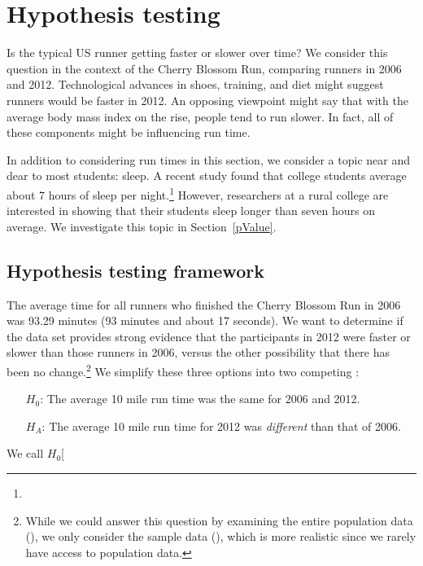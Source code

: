 \section{Hypothesis testing}
\label{hypothesisTesting}


Is the typical US runner getting faster or slower over time? We consider this question in the context of the Cherry Blossom Run, comparing runners in 2006 and 2012. Technological advances in shoes, training, and diet might suggest runners would be faster in 2012. An opposing viewpoint might say that with the average body mass index on the rise, people tend to run slower. In fact, all of these components might be influencing run time.

In addition to considering run times in this section, we consider a topic near and dear to most students: sleep. A recent study found that college students average about 7 hours of sleep per night.\footnote{} However, researchers at a rural college are interested in showing that their students sleep longer than seven hours on average. We investigate this topic in Section~\ref{pValue}.

\subsection{Hypothesis testing framework}

The average time for all runners who finished the Cherry Blossom Run in 2006 was 93.29 minutes (93 minutes and about 17 seconds). We want to determine if the  data set provides strong evidence that the participants in 2012 were faster or slower than those runners in 2006, versus the other possibility that there has been no change.\footnote{While we could answer this question by examining the entire population data (), we only consider the sample data (), which is more realistic since we rarely have access to population data.} We simplify these three options into two competing :
\begin{itemize}
\setlength{\itemsep}{0mm}
\item[$H_0$:] The average 10 mile run time was the same for 2006 and 2012.
\item[$H_A$:] The average 10 mile run time for 2012 was \emph{different} than that of 2006.
\end{itemize}
We call $H_0$\marginpar[\raggedright\vspace{6mm}

